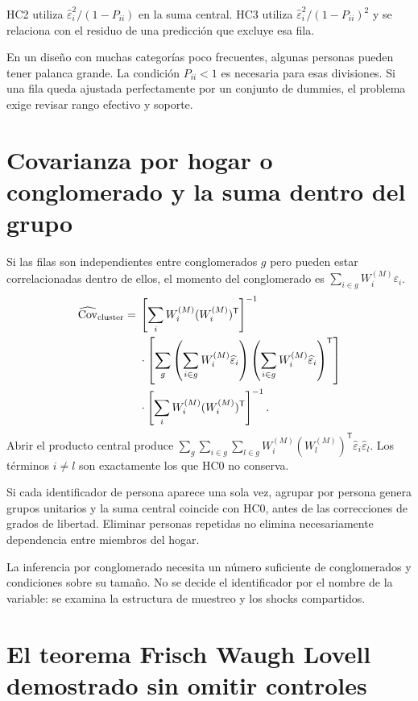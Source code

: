 \documentclass[11pt,a4paper]{article}
\DeclareMathOperator{\Cov}{Cov}
\begin{document}
HC2 utiliza $\widehat\varepsilon_i^2/(1-P_{ii})$ en la suma central. HC3 utiliza $\widehat\varepsilon_i^2/(1-P_{ii})^2$ y se relaciona con el residuo de una predicción que excluye esa fila.

En un diseño con muchas categorías poco frecuentes, algunas personas pueden tener palanca grande. La condición $P_{ii}<1$ es necesaria para esas divisiones. Si una fila queda ajustada perfectamente por un conjunto de dummies, el problema exige revisar rango efectivo y soporte.

\clearpage
\section{Covarianza por hogar o conglomerado y la suma dentro del grupo}

Si las filas son independientes entre conglomerados $g$ pero pueden estar correlacionadas dentro de ellos, el momento del conglomerado es $\sum_{i\in g}W_i^{(M)}\varepsilon_i$.
\[
\begin{aligned}
\widehat{\Cov}_{\rm cluster}
={}&\left[\sum_iW_i^{(M)}(W_i^{(M)})^{\mathsf T}\right]^{-1}\\
&\cdot\left[\sum_g
\left(\sum_{i\in g}W_i^{(M)}\widehat\varepsilon_i\right)
\left(\sum_{i\in g}W_i^{(M)}\widehat\varepsilon_i\right)^{\mathsf T}\right]\\
&\cdot\left[\sum_iW_i^{(M)}(W_i^{(M)})^{\mathsf T}\right]^{-1}.
\end{aligned}
\]
Abrir el producto central produce $\sum_g\sum_{i\in g}\sum_{l\in g}
W_i^{(M)}(W_l^{(M)})^{\mathsf T}\widehat\varepsilon_i\widehat\varepsilon_l$.
Los términos $i\ne l$ son exactamente los que HC0 no conserva.

Si cada identificador de persona aparece una sola vez, agrupar por persona genera grupos unitarios y la suma central coincide con HC0, antes de las correcciones de grados de libertad. Eliminar personas repetidas no elimina necesariamente dependencia entre miembros del hogar.

La inferencia por conglomerado necesita un número suficiente de conglomerados y condiciones sobre su tamaño. No se decide el identificador por el nombre de la variable: se examina la estructura de muestreo y los shocks compartidos.

\clearpage
\section{El teorema Frisch Waugh Lovell demostrado sin omitir controles}
\end{document}

